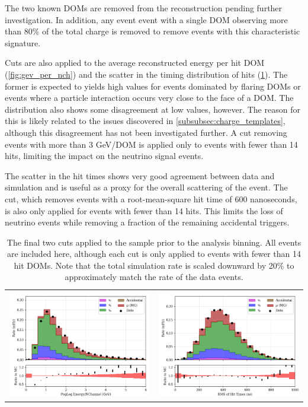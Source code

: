 The two known DOMs are removed from the reconstruction pending further investigation. 
In addition, any event event with a single DOM observing more than 80\% of the total charge is removed to remove events with this characteristic signature.

Cuts are also applied to the average reconstructed energy per hit DOM (\ref{fig:gev_per_nch}) and the scatter in the timing distribution of hits (\ref{fig:t_rms}).
The former is expected to yields high values for events dominated by flaring DOMs or events where a particle interaction occurs very close to the face of a DOM.
The distribution also shows some disagreement at low values, however.
The reason for this is likely related to the issues discovered in \ref{subsubsec:charge_templates}, although this disagreement has not been investigated further.
A cut removing events with more than 3 GeV/DOM is applied only to events with fewer than 14 hits, limiting the impact on the neutrino signal events.

The scatter in the hit times shows very good agreement between data and simulation and is useful as a proxy for the overall scattering of the event.
The cut, which removes events with a root-mean-square hit time of 600 nanoseconds, is also only applied for events with fewer than 14 hits.
This limits the loss of neutrino events while removing a fraction of the remaining accidental triggers.

\begin{center}
\begin{table}
\begin{tabular}{cc}
	\label{fig:gev_per_nch} \includegraphics[width=0.45\linewidth]{L7_GeV_per_channel.png} &
	\label{fig:t_rms} \includegraphics[width=0.45\linewidth]{L7_t_rms.png} \\
\end{tabular}
\caption{The final two cuts applied to the sample prior to the analysis binning. All events are included here, although each cut is only applied to events with fewer than 14 hit DOMs. Note that the total simulation rate is scaled downward by 20\% to approximately match the rate of the data events.}
\end{table}
\end{center}
